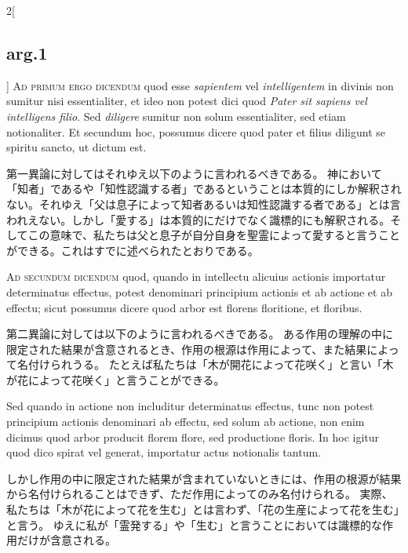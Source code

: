 \documentclass[paper=a4paper,fontsize=10pt,jafontsize=9pt,titlepage]{jlreq}
\begin{document}
\begin{paracol}{2}[\subsection{arg.1}]
{\scshape Ad primum ergo dicendum} quod esse {\itshape sapientem} vel {\itshape intelligentem} in
 divinis non sumitur nisi essentialiter, et ideo non potest dici quod
 {\itshape Pater sit sapiens vel intelligens filio}. Sed {\itshape diligere} sumitur non
 solum essentialiter, sed etiam notionaliter. Et secundum hoc,
 possumus dicere quod pater et filius diligunt se spiritu sancto, ut
 dictum est.

\switchcolumn

第一異論に対してはそれゆえ以下のように言われるべきである。
神において「知者」であるや「知性認識する者」であるということは本質的にしか解釈されない。それゆえ「父は息子によって知者あるいは知性認識する者である」とは言われえない。しかし「愛する」は本質的にだけでなく識標的にも解釈される。そしてこの意味で、私たちは父と息子が自分自身を聖霊によって愛すると言うことができる。これはすでに述べられたとおりである。

\switchcolumn*[\subsection{ad.2}]

{\scshape Ad secundum dicendum} quod, quando in intellectu alicuius actionis
 importatur determinatus effectus, potest denominari principium
 actionis et ab actione et ab effectu; sicut possumus dicere quod
 arbor est florens floritione, et floribus.

\switchcolumn

第二異論に対しては以下のように言われるべきである。
ある作用の理解の中に限定された結果が含意されるとき、作用の根源は作用によって、また結果によって名付けられうる。
たとえば私たちは「木が開花によって花咲く」と言い「木が花によって花咲く」と言うことができる。

\switchcolumn*

Sed quando in actione non
 includitur determinatus effectus, tunc non potest principium actionis
 denominari ab effectu, sed solum ab actione, non enim dicimus quod
 arbor producit florem flore, sed productione floris. In hoc igitur
 quod dico spirat vel generat, importatur actus notionalis tantum.

\switchcolumn

しかし作用の中に限定された結果が含まれていないときには、作用の根源が結果から名付けられることはできず、ただ作用によってのみ名付けられる。
実際、私たちは「木が花によって花を生む」とは言わず、「花の生産によって花を生む」と言う。
ゆえに私が「霊発する」や「生む」と言うことにおいては識標的な作用だけが含意される。


\end{paracol}
\end{document}
